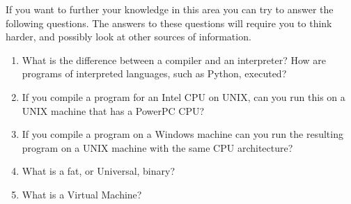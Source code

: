 \medskip
If you want to further your knowledge in this area you can try to answer the following questions. The answers to these questions will require you to think harder, and possibly look at other sources of information.
\begin{enumerate}
  \item What is the difference between a compiler and an interpreter? How are programs of interpreted languages, such as Python, executed?
  \item If you compile a program for an Intel CPU on UNIX, can you run this on a UNIX machine that has a PowerPC CPU?
  \item If you compile a program on a Windows machine can you run the resulting program on a UNIX machine with the same CPU architecture?
  \item What is a fat, or Universal, binary?
  \item What is a Virtual Machine?
\end{enumerate}



